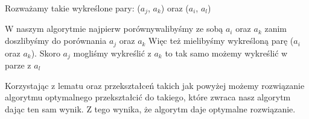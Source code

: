 \documentclass[a4paper,10pt]{article}
\begin{document}
Rozważamy takie wykreślone pary: \newline
 ($a_j$, $a_k$) oraz  ($a_i$, $a_l$)\newline
{} \newline
W naszym algorytmie najpierw porównywalibyśmy ze sobą $a_i$ oraz $a_k$ zanim doszlibyśmy
do porównania $a_j$ oraz $a_k$ Więc też mielibyśmy wykreśloną parę ($a_i$ oraz $a_k$). Skoro 
$a_j$ mogliśmy wykreślić z $a_k$ to tak samo możemy wykreślić w parze z $a_l$\newline
{}
\newline \newline
Korzystając z lematu oraz przekształceń takich jak powyżej możemy rozwiązanie algorytmu optymalnego przekształcić do takiego, które zwraca nasz algorytm dając ten sam wynik. Z tego wynika, że algorytm daje optymalne rozwiązanie.
\end{document}
